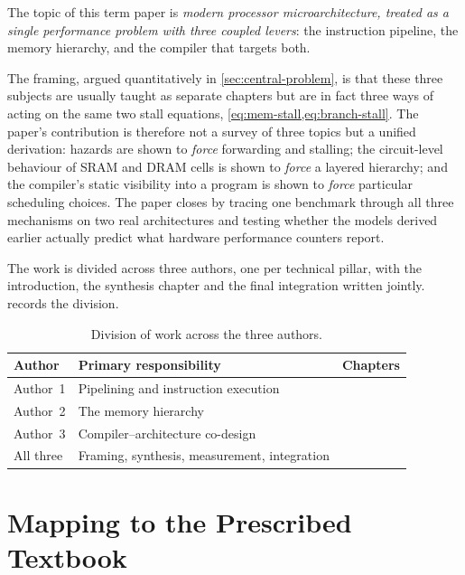 \documentclass[11pt,a4paper]{report}
\begin{document}
The topic of this term paper is \emph{modern processor
microarchitecture, treated as a single performance problem with three
coupled levers}: the instruction pipeline, the memory hierarchy, and the
compiler that targets both.

The framing, argued quantitatively in \cref{sec:central-problem}, is
that these three subjects are usually taught as separate chapters but
are in fact three ways of acting on the same two stall equations,
\cref{eq:mem-stall,eq:branch-stall}. The paper's contribution is
therefore not a survey of three topics but a unified derivation: hazards
are shown to \emph{force} forwarding and stalling; the circuit-level
behaviour of SRAM and DRAM cells is shown to \emph{force} a layered
hierarchy; and the compiler's static visibility into a program is shown
to \emph{force} particular scheduling choices. The paper closes by
tracing one benchmark through all three mechanisms on two real
architectures and testing whether the models derived earlier actually
predict what hardware performance counters report.

The work is divided across three authors, one per technical pillar, with
the introduction, the synthesis chapter and the final integration
written jointly.  records the division.

\begin{table}[htbp]
\centering
\caption{Division of work across the three authors.}
\label{tab:author-split}
\begin{tabular}{@{}L{0.18\textwidth}L{0.34\textwidth}L{0.38\textwidth}@{}}
\toprule
\textbf{Author} & \textbf{Primary responsibility} & \textbf{Chapters} \\
\midrule
Author~1 & Pipelining and instruction execution &
   \\
Author~2 & The memory hierarchy &
   \\
Author~3 & Compiler--architecture co-design &
   \\
All three & Framing, synthesis, measurement, integration &
   \\
\bottomrule
\end{tabular}
\end{table}

\section{Mapping to the Prescribed Textbook}
\label{sec:app-textbook}
\end{document}
